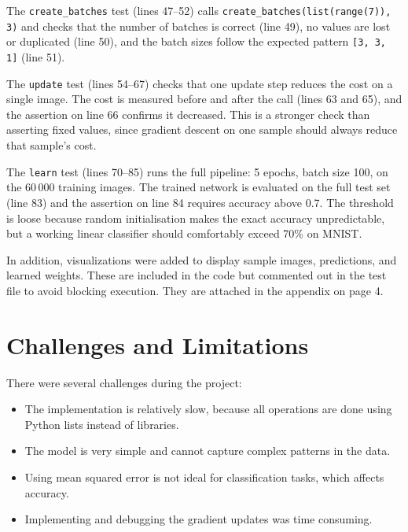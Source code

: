 \documentclass[a4paper, 11pt]{report}
\begin{document}
The \texttt{create\_batches} test (lines 47--52) calls \texttt{create\_batches(list(range(7)), 3)} and checks that the number of batches is correct (line 49), no values are lost or duplicated (line 50), and the batch sizes follow the expected pattern \texttt{[3, 3, 1]} (line 51).

The \texttt{update} test (lines 54--67) checks that one update step reduces the cost on a single image. The cost is measured before and after the call (lines 63 and 65), and the assertion on line 66 confirms it decreased. This is a stronger check than asserting fixed values, since gradient descent on one sample should always reduce that sample's cost.

The \texttt{learn} test (lines 70--85) runs the full pipeline: 5 epochs, batch size 100, on the 60\,000 training images. The trained network is evaluated on the full test set (line 83) and the assertion on line 84 requires accuracy above 0.7. The threshold is loose because random initialisation makes the exact accuracy unpredictable, but a working linear classifier should comfortably exceed 70\% on MNIST.

In addition, visualizations were added to display sample images, predictions, and learned weights. These are included in the code but commented out in the test file to avoid blocking execution. They are attached in the appendix on page 4.


\vspace{20pt}
\section*{Challenges and Limitations}

There were several challenges during the project:

\begin{itemize}
    \item The implementation is relatively slow, because all operations are done using Python lists instead of libraries.
    
    \item The model is very simple and cannot capture complex patterns in the data.
    
    \item Using mean squared error is not ideal for classification tasks, which affects accuracy.
    
    \item Implementing and debugging the gradient updates was time consuming.
\end{itemize}
\end{document}
